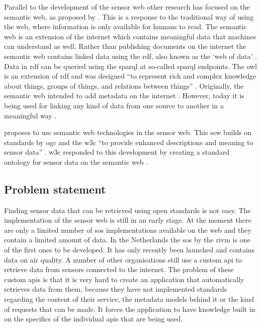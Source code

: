 Parallel to the development of the sensor web other research has focused on the semantic web, as proposed by \cite{LD:Berners-lee}. This is a response to the traditional way of using the web, where information is only available for humans to read. The semantic web is an extension of the internet which contains meaningful data that machines can understand as well. Rather than publishing documents on the internet the semantic web contains linked data using the \ac{rdf}, also known as the `web of data' \citep{LD:Bizer}. Data in \ac{rdf} can be queried using the \ac{sparql} at so-called \ac{sparql} endpoints. The \ac{owl} is an extension of \ac{rdf} and was designed \enquote{to represent rich and complex knowledge about things, groups of things, and relations between things} \citep{LD:OWL}. Originally, the semantic web intended to add metadata on the internet \citep{LD:W3C}. However, today it is being used for linking any kind of data from one source to another in a meaningful way \citep{LD:Cambridge}. 

\cite{SSW:Sheth} proposes to use semantic web technologies in the sensor web. This \ac{ssw} builds on standards by \ac{ogc} and the \ac{w3c} \enquote{to provide enhanced descriptions and meaning to sensor data} \cite[p. 78]{SSW:Sheth}. \ac{w3c} responded to this development by creating a standard ontology for sensor data on the semantic web \citep{SSW:SSN_incubatorGroup}. 
 
\subsection{Problem statement}
Finding sensor data that can be retrieved using open standards is not easy. The implementation of the sensor web is still in an early stage. At the moment there are only a limited number of \ac{sos} implementations available on the web and they contain a limited amount of data. In the Netherlands the \ac{sos} by the \ac{rivm} is one of the first ones to be developed. It has only recently been launched and contains data on air quality. A number of other organisations still use a custom \ac{api} to retrieve data from sensors connected to the internet. The problem of these custom \ac{api}s is that it is very hard to create an application that automatically retrieves data from them, because they have not implemented standards regarding the content of their service, the metadata models behind it or the kind of requests that can be made. It forces the application to have knowledge built in on the specifics of the individual \ac{api}s that are being used.  

